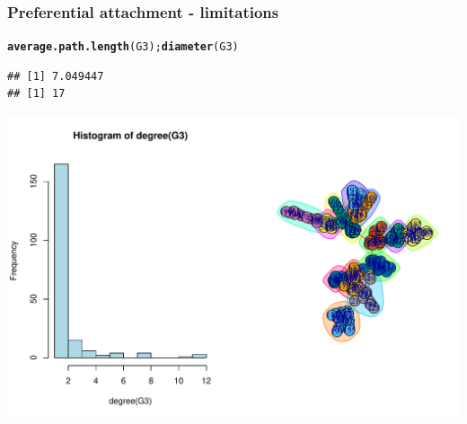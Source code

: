 \documentclass{beamer}\usepackage[]{graphicx}\usepackage[]{color}
\makeatletter
\newcommand{\hlstd}[1]{\textcolor[rgb]{0.345,0.345,0.345}{#1}}%
\newcommand{\hlkwd}[1]{\textcolor[rgb]{0.737,0.353,0.396}{\textbf{#1}}}%
\newenvironment{kframe}{%
 \def\at@end@of@kframe{}%
 \ifinner\ifhmode%
  \def\at@end@of@kframe{\end{minipage}}%
  \begin{minipage}{\columnwidth}%
 \fi\fi%
 \def\FrameCommand##1{\hskip\@totalleftmargin \hskip-\fboxsep
 \colorbox{shadecolor}{##1}\hskip-\fboxsep
     \hskip-\linewidth \hskip-\@totalleftmargin \hskip\columnwidth}%
 \MakeFramed {\advance\hsize-\width
   \@totalleftmargin\z@ \linewidth\hsize
   \@setminipage}}%
 {\par\unskip\endMakeFramed%
 \at@end@of@kframe}
\newenvironment{knitrout}{}{} %
\makeatother
\begin{document}
\begin{frame}[fragile]
  \frametitle{Preferential attachment - limitations}

\begin{knitrout}\scriptsize
{}\color{fgcolor}\begin{kframe}
\begin{alltt}
\hlkwd{average.path.length}\hlstd{(G3);} \hlkwd{diameter}\hlstd{(G3)}
\end{alltt}
\begin{verbatim}
## [1] 7.049447
## [1] 17
\end{verbatim}
\end{kframe}
\end{knitrout}

\begin{knitrout}\scriptsize
{}\color{fgcolor}
\includegraphics[width=.8\textwidth]{figures/PA_limitation2-1} 

\end{knitrout}
\end{frame}
\end{document}
